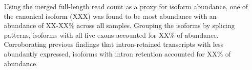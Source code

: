 Using the merged full-length read count as a proxy for isoform abundance, one of the canonical isoform (XXX) was found to be most abundance with an abundance of XX-XX\% across all samples. Grouping the isoforms by splicing patterns, isoforms with all five exons accounted for XX\% of abundance. Corroborating previous findings that intron-retained transcripts with less abundantly expressed, isoforms with intron retention accounted for XX\% of abundance.

   
